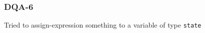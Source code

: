 \subsubsection{DQA-6}\label{sec:error_code_dqa_6}

Tried to assign-expression something to a variable of type \texttt{state}


